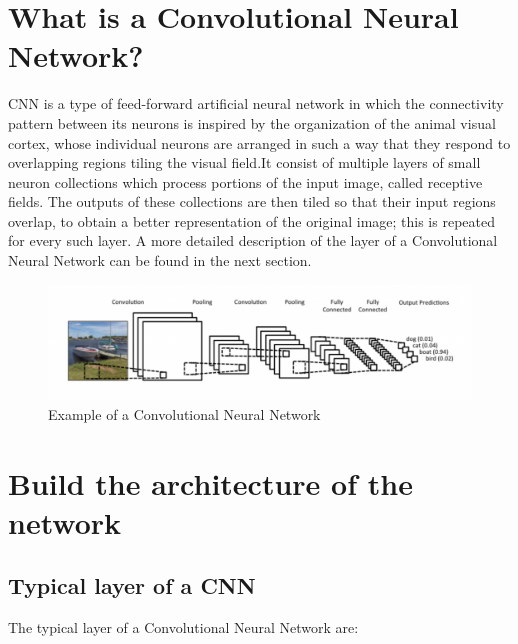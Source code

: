 \documentclass[]{report}
\begin{document}
\section{What is a Convolutional Neural Network?}

CNN is a type of feed-forward artificial neural network in which the connectivity pattern between its neurons is inspired by the organization of the animal visual cortex, whose individual neurons are arranged in such a way that they respond to overlapping regions tiling the visual field.It consist of multiple layers of small neuron collections which process portions of the input image, called receptive fields. The outputs of these collections are then tiled so that their input regions overlap, to obtain a better representation of the original image; this is repeated for every such layer. A more detailed description of the layer of a Convolutional Neural Network can be found in the next section.

\begin{figure}[h]
	\begin{center}
		\includegraphics[scale=0.3]{CNN.png}
		\caption{Example of a Convolutional Neural Network}
		\label{fig:CNN}
	\end{center}
\end{figure}
\newpage
\section{Build the architecture of the network}

\subsection{Typical layer of a CNN}

The typical layer of a Convolutional Neural Network are:
\end{document}
